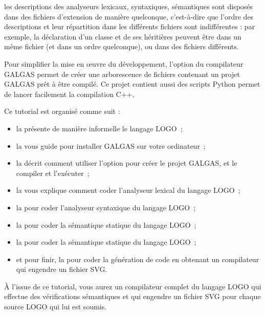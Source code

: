 les descriptions des analyseurs lexicaux, syntaxiques, sémantiques sont disposés dans des fichiers d'extension  de manière quelconque, c'est-à-dire que l'ordre des descriptions et leur répartition dans les différents fichiers sont indifférentes : par exemple, la déclaration d'un classe et de ses héritières peuvent être dans un même fichier (et dans un ordre quelconque), ou dans des fichiers différents.

Pour simplifier la mise en œuvre du développement, l'option  du compilateur GALGAS permet de créer une arborescence de fichiers contenant un projet GALGAS prêt à être compilé. Ce projet contient aussi des scripts Python permet de lancer facilement la compilation C++.

Ce tutorial est organisé comme suit :
\begin{itemize}
  \item la  présente de manière informelle le langage LOGO~;
  \item la  vous guide pour installer GALGAS sur votre ordinateur~;
  \item la  décrit comment utiliser l'option  pour créer le projet GALGAS, et le compiler et l'exécuter~;
  \item la  vous explique comment coder l'analyseur lexical du langage LOGO~;
  \item la  pour coder l'analyseur syntaxique du langage LOGO~;
  \item la  pour coder la sémantique statique du langage LOGO~;
  \item la  pour coder la sémantique statique du langage LOGO~;
  \item et pour finir, la  pour coder la génération de code en obtenant un compilateur qui engendre un fichier SVG.
\end{itemize}

À l'issue de ce tutorial, vous aurez un compilateur complet  du langage LOGO qui effectue des vérifications sémantiques et qui engendre un fichier SVG pour chaque source LOGO qui lui est soumis.







